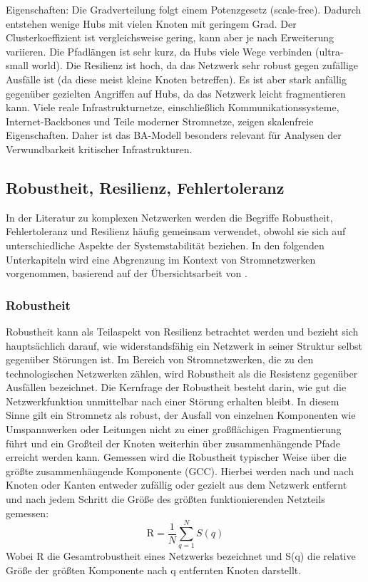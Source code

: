 Eigenschaften:
	Die Gradverteilung folgt einem Potenzgesetz (scale-free). Dadurch entstehen wenige Hubs mit vielen Knoten mit geringem Grad.
	Der Clusterkoeffizient ist vergleichsweise gering, kann aber je nach Erweiterung variieren.
	Die Pfadlängen ist sehr kurz, da Hubs viele Wege verbinden (ultra-small world).
	Die Resilienz ist hoch, da das Netzwerk sehr robust gegen zufällige Ausfälle ist (da diese meist kleine Knoten betreffen). Es ist aber stark anfällig gegenüber gezielten Angriffen auf Hubs, da das Netzwerk leicht fragmentieren kann.
Viele reale Infrastrukturnetze, einschließlich Kommunikationssysteme, Internet-Backbones und Teile moderner Stromnetze, zeigen skalenfreie Eigenschaften. Daher ist das BA-Modell besonders relevant für Analysen der Verwundbarkeit kritischer Infrastrukturen.

\subsection{Robustheit, Resilienz, Fehlertoleranz}
In der Literatur zu komplexen Netzwerken werden die Begriffe Robustheit, Fehlertoleranz und Resilienz häufig gemeinsam verwendet, obwohl sie sich auf unterschiedliche Aspekte der Systemstabilität beziehen. In den folgenden Unterkapiteln wird eine Abgrenzung im Kontext von Stromnetzwerken vorgenommen, basierend auf der Übersichtsarbeit von \cite{Qi2024}. 
\subsubsection{Robustheit}
Robustheit kann als Teilaspekt von Resilienz betrachtet werden  und bezieht sich hauptsächlich darauf, wie widerstandsfähig ein Netzwerk in seiner Struktur selbst gegenüber Störungen ist. Im Bereich von Stromnetzwerken, die zu den technologischen Netzwerken zählen, wird Robustheit als die Resistenz gegenüber Ausfällen bezeichnet. Die Kernfrage der Robustheit besteht darin, wie gut die Netzwerkfunktion unmittelbar nach einer Störung erhalten bleibt. In diesem Sinne gilt ein Stromnetz als robust, der Ausfall von einzelnen Komponenten wie Umspannwerken oder Leitungen nicht zu einer großflächigen Fragmentierung führt und ein Großteil der Knoten weiterhin über zusammenhängende Pfade erreicht werden kann. 
Gemessen wird die Robustheit typischer Weise über die größte zusammenhängende Komponente (GCC). Hierbei werden nach und nach Knoten oder Kanten entweder zufällig oder gezielt aus dem Netzwerk entfernt und nach jedem Schritt die Größe des größten funktionierenden Netzteils gemessen: 
\[
\mathrm{R} = \frac{1}{N} \sum_{q=1}^{N} S(q)
\]
Wobei R die Gesamtrobustheit eines Netzwerks bezeichnet und S(q) die relative Größe der größten Komponente nach q entfernten Knoten darstellt. 

